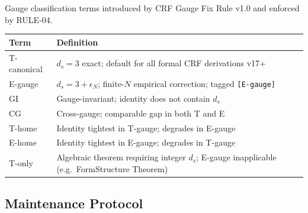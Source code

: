 \documentclass[12pt, a4paper]{article}
\begin{document}
\begin{langbox}[title={LANG-06 \textmd{---} T-canonical / E-gauge / GI / CG}]
Gauge classification terms introduced by CRF Gauge Fix Rule v1.0
and enforced by RULE-04.

\medskip
\begin{center}
\renewcommand{\arraystretch}{1.35}
\begin{tabular}{p{2.5cm} p{9.5cm}}
\toprule
\textbf{Term} & \textbf{Definition}\\
\midrule
T-canonical & $d_s = 3$ exact; default for all formal CRF derivations v17+\\
E-gauge & $d_s = 3 + \epsilon_N$; finite-$N$ empirical correction;
  tagged \texttt{[E-gauge]}\\
GI & Gauge-invariant; identity does not contain $d_s$\\
CG & Cross-gauge; comparable gap in both T and E\\
T-home & Identity tightest in T-gauge; degrades in E-gauge\\
E-home & Identity tightest in E-gauge; degrades in T-gauge\\
T-only & Algebraic theorem requiring integer $d_s$;
  E-gauge inapplicable (e.g.\ FormStructure Theorem)\\
\bottomrule
\end{tabular}
\end{center}
\end{langbox}

\subsection{Maintenance Protocol}
\end{document}
